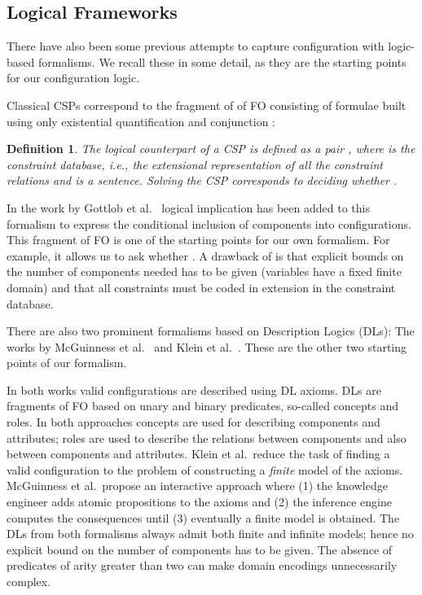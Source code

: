 \documentclass[copyright,creativecommons]{eptcs}
\newtheorem{definition}{Definition}
\begin{document}
\subsection{Logical Frameworks}

There have also been some previous attempts to capture configuration with logic-based formalisms. 
We recall these in some detail, as they are the starting points for our configuration logic.

Classical CSPs correspond to the fragment  of  of FO consisting of formulae built using only existential quantification and conjunction \cite{kolaitis:cqc_csp}\/:


\begin{definition}
The logical counterpart of a CSP is defined as a pair , where  is the \textit{constraint database}, 
i.e., the extensional representation of all the constraint relations and  is a  sentence.
Solving the CSP corresponds to deciding whether .
\label{def:csp_logic}
\end{definition}

In the work by Gottlob et al.\ \cite{gottlob:conditional} logical implication has been added to this formalism to express the conditional inclusion of components into configurations.
This  fragment of FO is one of the starting points for our own formalism.
For example, it allows us to ask whether .
A drawback of  is that explicit bounds on the number of components needed has to be given (variables have a fixed finite domain)
and that all constraints must be coded in extension in the constraint database. 

There are also two prominent formalisms based on Description Logics (DLs)\/: 
The works by McGuinness et al.\ \cite{McguinnessW98} and Klein et al.\ \cite{DFKI-TM-95-01}. 
These are the other two starting points of our formalism.

In both works valid configurations are described using DL axioms. 
DLs are fragments of FO based on unary and binary predicates, so-called concepts and roles.
In both approaches concepts are used for describing components and attributes; roles are used to describe the relations between components and also between components and attributes.
Klein et al.\ reduce the task of finding a valid configuration to the problem of constructing a {\em finite} model of the axioms. 
McGuinness et al.\ propose an interactive approach where (1) the knowledge engineer adds atomic propositions to the axioms and (2) the inference engine computes the consequences until (3) eventually a finite model is obtained. 
The DLs from both formalisms always admit both finite and infinite models; hence no explicit bound on the number of components has to be given.
The absence of predicates of arity greater than two can make domain encodings unnecessarily complex.
\end{document}
